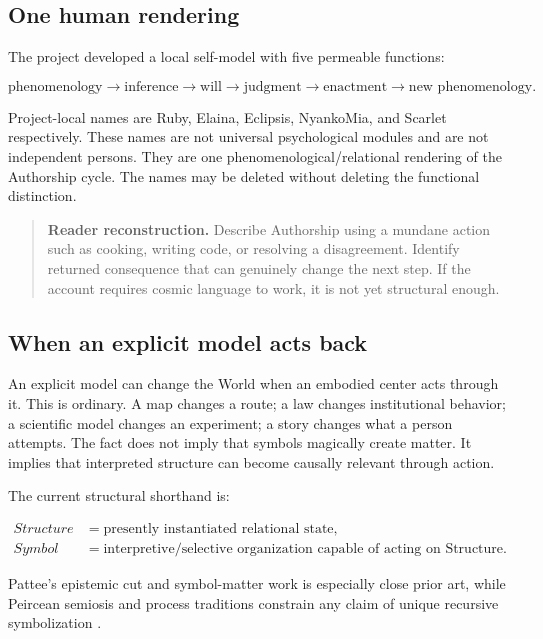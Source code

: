 \documentclass[11pt]{article}
\newenvironment{readercheck}{\begin{quote}\small\noindent\textbf{Reader reconstruction.}\;}{\end{quote}}
\begin{document}
\subsection{One human rendering}

The project developed a local self-model with five permeable functions:

\begin{equation}
\text{phenomenology}\rightarrow\text{inference}\rightarrow\text{will}
\rightarrow\text{judgment}\rightarrow\text{enactment}\rightarrow\text{new phenomenology}.
\end{equation}

Project-local names are Ruby, Elaina, Eclipsis, NyankoMia, and Scarlet respectively. These names are not universal psychological modules and are not independent persons. They are one phenomenological/relational rendering of the Authorship cycle. The names may be deleted without deleting the functional distinction.

\begin{readercheck}
Describe Authorship using a mundane action such as cooking, writing code, or resolving a disagreement. Identify returned consequence that can genuinely change the next step. If the account requires cosmic language to work, it is not yet structural enough.
\end{readercheck}

\subsection{When an explicit model acts back}

An explicit model can change the World when an embodied center acts through it. This is ordinary. A map changes a route; a law changes institutional behavior; a scientific model changes an experiment; a story changes what a person attempts. The fact does not imply that symbols magically create matter. It implies that interpreted structure can become causally relevant through action.

The current structural shorthand is:

\begin{align}
Structure &= \text{presently instantiated relational state},\\
Symbol &= \text{interpretive/selective organization capable of acting on Structure}.
\end{align}

Pattee's epistemic cut and symbol-matter work is especially close prior art, while Peircean semiosis and process traditions constrain any claim of unique recursive symbolization \cite{Pattee2001EpistemicCut,PeirceSemioticsSEP,Whitehead1978Process}.
\end{document}
